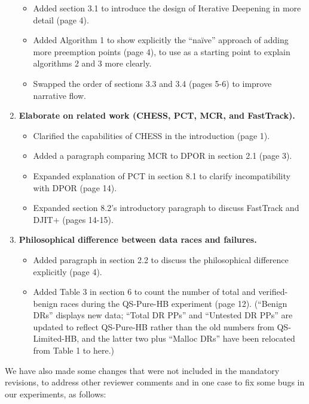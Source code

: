 \documentclass{article}
\begin{document}
\begin{enumerate}
	\begin{itemize}
		\item Added section 3.1 to introduce the design of Iterative Deepening in more detail (page 4).
		\item Added Algorithm 1 to show explicitly the ``na\"ive'' approach of adding more preemption points (page 4), to use as a starting point to explain algorithms 2 and 3 more clearly.
		\item Swapped the order of sections 3.3 and 3.4 (pages 5-6) to improve narrative flow.
	\end{itemize}
	\item {\bf Elaborate on related work (CHESS, PCT, MCR, and FastTrack).}
	\begin{itemize}
		\item Clarified the capabilities of CHESS in the introduction (page 1).
		\item Added a paragraph comparing MCR to DPOR in section 2.1 (page 3).
		\item Expanded explanation of PCT in section 8.1 to clarify incompatibility with DPOR (page 14).
		\item Expanded section 8.2's introductory paragraph to discuss FastTrack and DJIT+ (pages 14-15).
	\end{itemize}
	\item {\bf Philosophical difference between data races and failures.}
	\begin{itemize}
		\item Added paragraph in section 2.2 to discuss the philosophical difference explicitly (page 4).
		\item Added Table 3 in section 6 to count the number of total and verified-benign races during the QS-Pure-HB experiment (page 12). (``Benign DRs'' displays new data; ``Total DR PPs'' and ``Untested DR PPs'' are updated to reflect QS-Pure-HB rather than the old numbers from QS-Limited-HB, and the latter two plus ``Malloc DRs'' have been relocated from Table 1 to here.)
	\end{itemize}
\end{enumerate}

We have also made some changes that were not included in the mandatory revisions, to address other reviewer comments and in one case to fix some bugs in our experiments, as follows:
\end{document}
